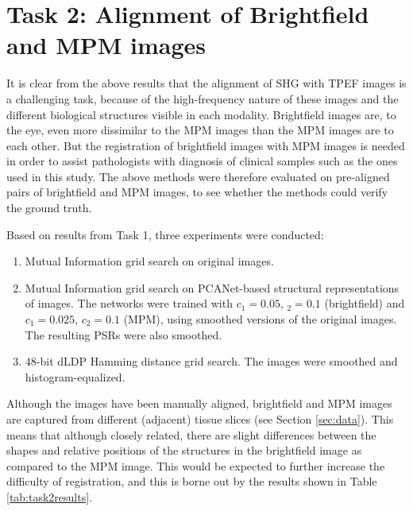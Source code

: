 \documentclass{report}
\begin{document}
\section{Task 2: Alignment of Brightfield and MPM images}
\label{sec:eval_bf_mpm}

It is clear from the above results that the alignment of SHG with TPEF images is a challenging task, because of the high-frequency nature of these images and the different biological structures visible in each modality. Brightfield images are, to the eye, even more dissimilar to the MPM images than the MPM images are to each other. But the registration of brightfield images with MPM images is needed in order to assist pathologists with diagnosis of clinical samples such as the ones used in this study. The above methods were therefore evaluated on pre-aligned pairs of brightfield and MPM images, to see whether the methods could verify the ground truth.

Based on results from Task 1, three experiments were conducted:
\begin{enumerate}
    \item Mutual Information grid search on original images.
    \item Mutual Information grid search on PCANet-based structural representations of images. The networks were trained with $c_1=0.05$, $_2=0.1$ (brightfield) and $c_1=0.025$, $c_2=0.1$ (MPM), using smoothed versions of the original images. The resulting PSRs were also smoothed.
    \item 48-bit dLDP Hamming distance grid search. The images were smoothed and histogram-equalized.
\end{enumerate}

Although the images have been manually aligned, brightfield and MPM images are captured from different (adjacent) tissue slices (see Section \ref{sec:data}). This means that although closely related, there are slight differences between the shapes and relative positions of the structures in the brightfield image as compared to the MPM image. This would be expected to further increase the difficulty of registration, and this is borne out by the results shown in Table \ref{tab:task2results}.
\end{document}
